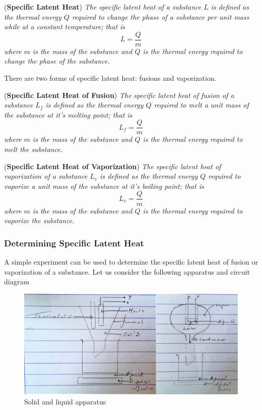 \begin{definition}{(\textbf{Specific Latent Heat})}
\textit{The specific latent heat of a substance $L$ is defined as the thermal energy $Q$ required to change the phase of a substance per unit mass while at a constant temperature; that is}
\begin{equation}
    L = \frac{Q}{m}
\end{equation}
\textit{where $m$ is the mass of the substance and $Q$ is the thermal energy required to change the phase of the substance.}
\end{definition}
\noindent There are two forms of specific latent heat: fusions and vaporization.

\begin{definition}{(\textbf{Specific Latent Heat of Fusion})}
\textit{The specific latent heat of fusion of a substance $L_f$ is defined as the thermal energy $Q$ required to melt a unit mass of the substance at it's melting point; that is}
\begin{equation}
    L_f = \frac{Q}{m}
\end{equation}
\textit{where $m$ is the mass of the substance and $Q$ is the thermal energy required to melt the substance.}
\end{definition}

\begin{definition}{(\textbf{Specific Latent Heat of Vaporization})}
\textit{The specific latent heat of vaporization of a substance $L_v$ is defined as the thermal energy $Q$ required to vaporize a unit mass of the substance at it's boiling point; that is}
\begin{equation}
    L_v = \frac{Q}{m}
\end{equation}
\textit{where $m$ is the mass of the substance and $Q$ is the thermal energy required to vaporize the substance.}
\end{definition}

\subsubsection{Determining Specific Latent Heat}

A simple experiment can be used to determine the specific latent heat of fusion or vaporization of a substance. Let us consider the following apparatus and circuit diagram

\begin{figure}[h!]
    \centering
    \includegraphics[scale=0.55]{notes/images/Specific-Latent-Heat.JPG}
    \caption{Solid and liquid apparatus}
\end{figure}
\FloatBarrier

